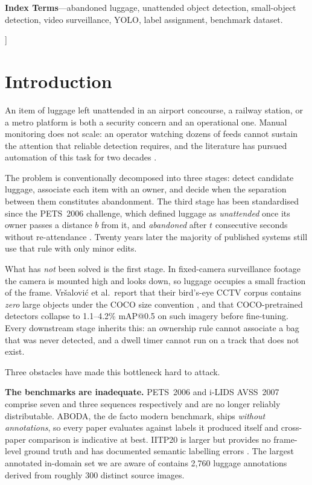 \documentclass[10pt,twocolumn,a4paper]{article}
\begin{document}
\begin{@twocolumnfalse}
\vspace{6pt}
\noindent\small\textbf{Index Terms}---abandoned luggage, unattended object
detection, small-object detection, video surveillance, YOLO, label assignment,
benchmark dataset.
\vspace{16pt}
\end{@twocolumnfalse}
]

\section{Introduction}

\noindent
An item of luggage left unattended in an airport concourse, a railway station, or
a metro platform is both a security concern and an operational one. Manual
monitoring does not scale: an operator watching dozens of feeds cannot sustain
the attention that reliable detection requires, and the literature has pursued
automation of this task for two decades \cite{pets2006overview}.

The problem is conventionally decomposed into three stages: detect candidate
luggage, associate each item with an owner, and decide when the separation
between them constitutes abandonment. The third stage has been standardised since
the PETS~2006 challenge, which defined luggage as \emph{unattended} once its
owner passes a distance $b$ from it, and \emph{abandoned} after $t$ consecutive
seconds without re-attendance \cite{pets2006overview}. Twenty years later the
majority of published systems still use that rule with only minor edits.

What has \emph{not} been solved is the first stage. In fixed-camera surveillance
footage the camera is mounted high and looks down, so luggage occupies a small
fraction of the frame. Vr\v{s}alovi\'{c} et al.\ report that their bird's-eye CCTV
corpus contains \emph{zero} large objects under the COCO size convention
\cite{vrsalovic2025sensors}, and that COCO-pretrained detectors collapse to
1.1--4.2\% mAP@0.5 on such imagery before fine-tuning. Every downstream stage
inherits this: an ownership rule cannot associate a bag that was never detected,
and a dwell timer cannot run on a track that does not exist.

Three obstacles have made this bottleneck hard to attack.

\textbf{The benchmarks are inadequate.} PETS~2006 and i-LIDS AVSS~2007 comprise
seven and three sequences respectively and are no longer reliably distributable.
ABODA, the de facto modern benchmark, ships \emph{without annotations}, so every
paper evaluates against labels it produced itself and cross-paper comparison is
indicative at best. IITP20 is larger but provides no frame-level ground truth and
has documented semantic labelling errors \cite{vrsalovic2025picom}. The largest
annotated in-domain set we are aware of contains 2{,}760 luggage annotations
derived from roughly 300 distinct source images.
\end{document}
